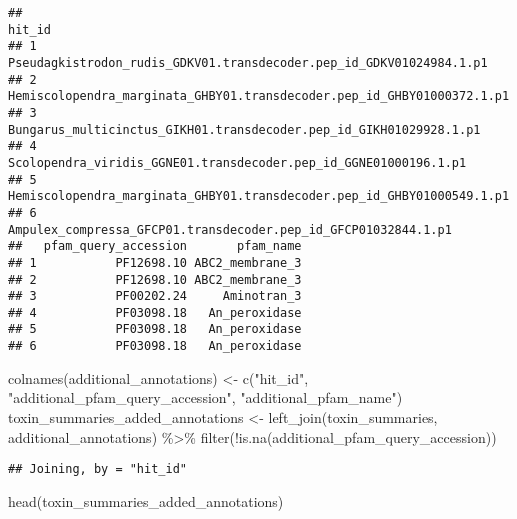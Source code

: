 \documentclass[
]{article}
\newenvironment{Shaded}{\begin{snugshade}}{\end{snugshade}}
\newcommand{\FunctionTok}[1]{\textcolor[rgb]{0.00,0.00,0.00}{#1}}
\newcommand{\NormalTok}[1]{#1}
\newcommand{\OtherTok}[1]{\textcolor[rgb]{0.56,0.35,0.01}{#1}}
\newcommand{\SpecialCharTok}[1]{\textcolor[rgb]{0.00,0.00,0.00}{#1}}
\newcommand{\StringTok}[1]{\textcolor[rgb]{0.31,0.60,0.02}{#1}}
\begin{document}
\begin{verbatim}
##                                                                   hit_id
## 1    Pseudagkistrodon_rudis_GDKV01.transdecoder.pep_id_GDKV01024984.1.p1
## 2 Hemiscolopendra_marginata_GHBY01.transdecoder.pep_id_GHBY01000372.1.p1
## 3     Bungarus_multicinctus_GIKH01.transdecoder.pep_id_GIKH01029928.1.p1
## 4       Scolopendra_viridis_GGNE01.transdecoder.pep_id_GGNE01000196.1.p1
## 5 Hemiscolopendra_marginata_GHBY01.transdecoder.pep_id_GHBY01000549.1.p1
## 6         Ampulex_compressa_GFCP01.transdecoder.pep_id_GFCP01032844.1.p1
##   pfam_query_accession       pfam_name
## 1           PF12698.10 ABC2_membrane_3
## 2           PF12698.10 ABC2_membrane_3
## 3           PF00202.24     Aminotran_3
## 4           PF03098.18   An_peroxidase
## 5           PF03098.18   An_peroxidase
## 6           PF03098.18   An_peroxidase
\end{verbatim}

\begin{Shaded}
\begin{Highlighting}[]
\FunctionTok{colnames}\NormalTok{(additional\_annotations) }\OtherTok{\textless{}{-}} \FunctionTok{c}\NormalTok{(}\StringTok{"hit\_id"}\NormalTok{, }\StringTok{"additional\_pfam\_query\_accession"}\NormalTok{, }\StringTok{"additional\_pfam\_name"}\NormalTok{)}
\NormalTok{toxin\_summaries\_added\_annotations }\OtherTok{\textless{}{-}} \FunctionTok{left\_join}\NormalTok{(toxin\_summaries, additional\_annotations) }\SpecialCharTok{\%\textgreater{}\%} 
  \FunctionTok{filter}\NormalTok{(}\SpecialCharTok{!}\FunctionTok{is.na}\NormalTok{(additional\_pfam\_query\_accession))}
\end{Highlighting}
\end{Shaded}

\begin{verbatim}
## Joining, by = "hit_id"
\end{verbatim}

\begin{Shaded}
\begin{Highlighting}[]
\FunctionTok{head}\NormalTok{(toxin\_summaries\_added\_annotations) }
\end{Highlighting}
\end{Shaded}
\end{document}
